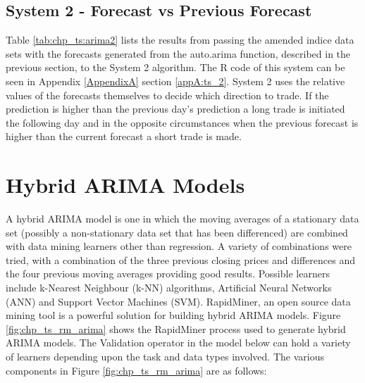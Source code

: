 

\subsection{System 2 - Forecast vs Previous Forecast}
Table \ref{tab:chp_ts:arima2} lists the results from passing the amended indice data sets with the forecasts generated from the auto.arima function, described in the previous section, to the System 2 algorithm. The R code of this system can be seen in  Appendix \ref{AppendixA} section \ref{appA:ts_2}. System 2 uses the relative values of the forecasts themselves to decide which direction to trade. If the prediction is higher than the previous day's prediction a long trade is initiated the following day and in the opposite circumstances when the previous forecast is higher than the current forecast a short trade is made.


\section{Hybrid ARIMA Models}
\label{sec:arima:chp5}
A hybrid ARIMA model is one in which the moving averages of a stationary data set (possibly a non-stationary data set that has been differenced) are combined with data mining learners other than regression. A variety of combinations were tried, with a combination of the three previous closing prices and differences and the four previous moving averages providing good results. Possible learners include k-Nearest Neighbour (k-NN) algorithms, Artificial Neural Networks (ANN) and Support Vector Machines (SVM).  RapidMiner, an open source data mining tool is a powerful solution for building hybrid ARIMA models. Figure \ref{fig:chp_ts_rm_arima} shows the RapidMiner process used to generate hybrid ARIMA models. The Validation operator in the model below can hold a variety of learners depending upon the task and data types involved. The various components in Figure \ref{fig:chp_ts_rm_arima} are as follows:


